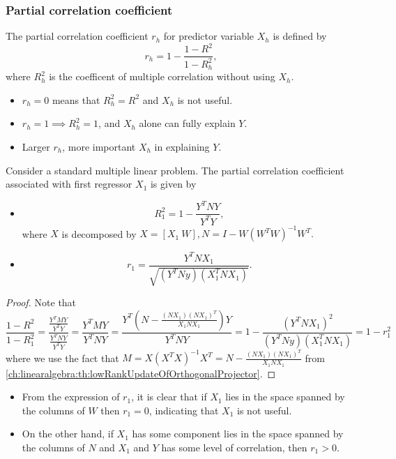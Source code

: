 \begin{refsection}
\subsubsection{Partial correlation coefficient}
\begin{definition}\cite[173]{theil1971principles}
The partial correlation coefficient $r_h$ for predictor variable $X_h$ is defined by	
	$$r_h = 1 - \frac{1-R^2}{1-R^2_h},$$
	where $R^2_h$ is the coefficent of multiple correlation without using $X_h$.	
\end{definition}


\begin{remark}\hfill
\begin{itemize}
	\item $r_h = 0$ means that $R_h^2 = R^2$ and $X_h$ is not useful.
	\item $r_h = 1 \implies R_h^2 = 1$, and $X_h$ alone can fully explain $Y$.
	\item Larger $r_h$, more important $X_h$ in explaining $Y$.
\end{itemize}	
\end{remark}



\begin{lemma}\cite[173]{theil1971principles}
Consider a standard multiple linear problem. The partial correlation coefficient associated with first regressor $X_1$ is given by
\begin{itemize}
	\item 
	$$R_1^2 = 1 - \frac{Y^TNY}{Y^TY},$$
	where  $X$ is decomposed by $X = [X_1 ~ W], N = I - W(W^TW)^{-1}W^T.$
	\item $$r_1 = \frac{Y^TNX_1}{\sqrt{(Y^TNy)(X_1^TNX_1)}}.$$
\end{itemize}	
\end{lemma}
\begin{proof}
Note that 
$$\frac{1-R^2}{1-R_1^2} = \frac{\frac{Y^TMY}{Y^TY}}{\frac{Y^TNY}{Y^TY}} = \frac{Y^TMY}{Y^TNY} = \frac{Y^T(N - \frac{(NX_1)(NX_1)^T}{X_1NX_1})Y}{Y^TNY} = 1 -\frac{(Y^TNX_1)^2}{(Y^TNy)(X_1^TNX_1)} = 1-r_1^2 $$	
where we use the fact that
$M = X(X^TX)^{-1}X^T = N - \frac{(NX_1)(NX_1)^T}{X_1NX_1}$ from \autoref{ch:linearalgebra:th:lowRankUpdateOfOrthogonalProjector}.
\end{proof}

\begin{remark}[interpretation]\hfill
\begin{itemize}
	\item From the expression of $r_1$, it is clear that if $X_1$ lies in the space spanned by the columns of $W$ then $r_1 = 0$, indicating that $X_1$ is not useful.	
	\item On the other hand, if $X_1$ has some component lies in the space spanned by the columns of $N$ and $X_1$ and $Y$ has some level of correlation, then $r_1 > 0$.
\end{itemize}


\end{remark}
\end{refsection}
